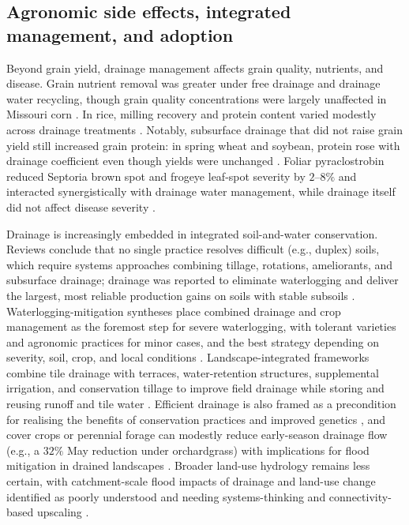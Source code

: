 \subsection{Agronomic side effects, integrated management, and adoption}

Beyond grain yield, drainage management affects grain quality, nutrients, and disease. Grain nutrient removal was greater under free drainage and drainage water recycling, though grain quality concentrations were largely unaffected in Missouri corn \parencite{Kaur2021}. In rice, milling recovery and protein content varied modestly across drainage treatments \parencite{DarziNaftchali2017b}. Notably, subsurface drainage that did not raise grain yield still increased grain protein: in spring wheat and soybean, protein rose with drainage coefficient even though yields were unchanged \parencite{Wiersma2010}. Foliar pyraclostrobin reduced Septoria brown spot and frogeye leaf-spot severity by \(2\textrm{--}8\%\) and interacted synergistically with drainage water management, while drainage itself did not affect disease severity \parencite{Nelson2011b}.

Drainage is increasingly embedded in integrated soil-and-water conservation. Reviews conclude that no single practice resolves difficult (e.g., duplex) soils, which require systems approaches combining tillage, rotations, ameliorants, and subsurface drainage; drainage was reported to eliminate waterlogging and deliver the largest, most reliable production gains on soils with stable subsoils \parencite{GARDNER1992}. Waterlogging-mitigation syntheses place combined drainage and crop management as the foremost step for severe waterlogging, with tolerant varieties and agronomic practices for minor cases, and the best strategy depending on severity, soil, crop, and local conditions \parencite{Manik2019}. Landscape-integrated frameworks combine tile drainage with terraces, water-retention structures, supplemental irrigation, and conservation tillage to improve field drainage while storing and reusing runoff and tile water \parencite{Li2021b}. Efficient drainage is also framed as a precondition for realising the benefits of conservation practices and improved genetics \parencite{Rui2024}, and cover crops or perennial forage can modestly reduce early-season drainage flow (e.g., a \(32\%\) May reduction under orchardgrass) with implications for flood mitigation in drained landscapes \parencite{Goeken2015,Daigh2014}. Broader land-use hydrology remains less certain, with catchment-scale flood impacts of drainage and land-use change identified as poorly understood and needing systems-thinking and connectivity-based upscaling \parencite{Rogger2017}.

